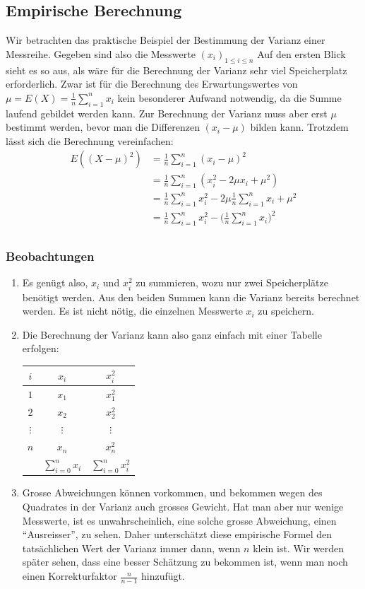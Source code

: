 \subsection{Empirische Berechnung}
Wir betrachten das praktische Beispiel der Bestimmung der Varianz
einer Messreihe.
Gegeben sind also die Messwerte $(x_i)_{1\le i\le n}$
Auf den ersten Blick sieht es so aus, als wäre für die Berechnung der Varianz
sehr viel Speicherplatz erforderlich.
Zwar ist für die Berechnung des
Erwartungswertes von $\mu=E(X)=\frac1n\sum_{i=1}^n x_i$ kein besonderer Aufwand
notwendig, da die Summe laufend gebildet werden kann.
Zur Berechnung der
Varianz muss aber erst $\mu$ bestimmt werden, bevor man die Differenzen $(x_i-\mu)$
bilden kann.
Trotzdem lässt sich die Berechnung vereinfachen:
\begin{align*}
E((X-\mu)^2)&=\frac1n\sum_{i=1}^n(x_i-\mu)^2\\
&=\frac1n\sum_{i=1}^n(x_i^2-2\mu x_i+\mu^2)\\
&=\frac1n\sum_{i=1}^nx_i^2-2\mu\frac1n\sum_{i=1}^n x_i+\mu^2\\
&=\frac1n\sum_{i=1}^nx_i^2-\biggl(\frac1n\sum_{i=1}^nx_i\biggr)^2\\
\end{align*}
\subsubsection{Beobachtungen}
\begin{enumerate}
\item
Es genügt also, $x_i$ und $x_i^2$ zu summieren, wozu nur zwei Speicherplätze
benötigt werden.
Aus den beiden Summen kann die Varianz bereits berechnet werden.
Es ist nicht nötig, die einzelnen Messwerte $x_i$ zu speichern.
\item
Die Berechnung der Varianz kann also ganz einfach mit einer Tabelle
erfolgen:
\begin{center}
\begin{tabular}{|c|c|c|}
\hline
$i$&$x_i$&$x_i^2$\\
\hline
$1$&$x_1$&$x_1^2$\\
$2$&$x_2$&$x_2^2$\\
$\vdots$&$\vdots$&$\vdots$\\
$n$&$x_n$&$x_n^2$\\
\hline
&$\sum_{i=0}^n x_i$&$\sum_{i=0}^n x_i^2$\\
\hline
\end{tabular}
\end{center}
\item
Grosse Abweichungen können vorkommen, und bekommen wegen des
Quadrates in der Varianz auch grosses Gewicht.
Hat man aber nur
wenige Messwerte, ist es unwahrscheinlich, eine solche grosse
Abweichung, einen ``Ausreisser'', zu sehen.
Daher unterschätzt
diese empirische Formel den tatsächlichen Wert der Varianz immer
dann, wenn $n$ klein ist.
Wir werden später sehen, dass eine
besser Schätzung zu bekommen ist, wenn man noch einen Korrekturfaktor
$\frac{n}{n-1}$ hinzufügt.
\end{enumerate}

